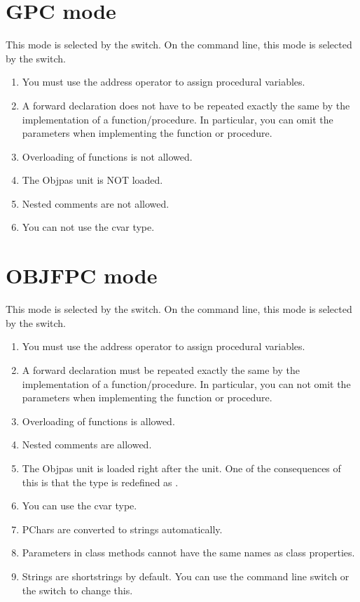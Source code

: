 \section{GPC mode}
This mode is selected by the  switch. On the command line,
this mode is selected by the  switch.
\begin{enumerate}
\item You must use the address operator to assign procedural variables.
\item A forward declaration does not have to be repeated exactly the same by the
implementation of a function/procedure. In particular, you can omit the
parameters when implementing the function or procedure.
\item Overloading of functions is not allowed.
\item The Objpas unit is NOT loaded.
\item Nested comments are not allowed.
\item You can not use the cvar type.
\end{enumerate}

\section{OBJFPC mode}
This mode is selected by the  switch. On the command line,
this mode is selected by the  switch.
\begin{enumerate}
\item You must use the address operator to assign procedural variables.
\item A forward declaration must be repeated exactly the same by the
implementation of a function/procedure. In particular, you can not omit the
parameters when implementing the function or procedure.
\item Overloading of functions is allowed.
\item Nested comments are allowed.
\item The Objpas unit is loaded right after the  unit. One of the
consequences of this is that the type  is redefined as
.
\item You can use the cvar type.
\item PChars are converted to strings automatically.
\item Parameters in class methods cannot have the same names as class
properties.
\item Strings are shortstrings by default. You can use the 
command line switch or the  switch to change this.
\end{enumerate}

